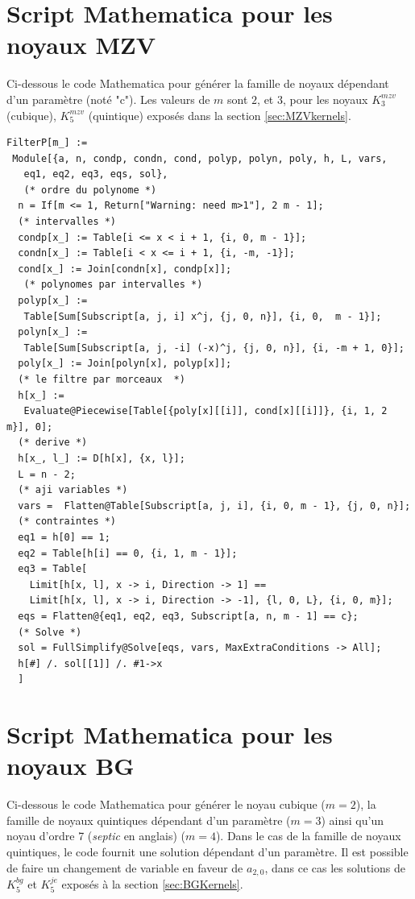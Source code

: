 \documentclass[11pt,twoside]{article}
\begin{document}
\section{Script Mathematica pour les noyaux MZV}
\label{sec:MathMZV}
Ci-dessous le code Mathematica pour générer la famille de noyaux dépendant d'un paramètre (noté "c"). Les valeurs de $m$ sont $2$, et $3$, pour les noyaux $K^{mzv}_3$ (cubique), $K^{mzv}_5$ (quintique) exposés dans la section \ref{sec:MZVkernels}.

\begin{lstlisting}[language=iPython]
FilterP[m_] := 
 Module[{a, n, condp, condn, cond, polyp, polyn, poly, h, L, vars, 
   eq1, eq2, eq3, eqs, sol},
   (* ordre du polynome *)
  n = If[m <= 1, Return["Warning: need m>1"], 2 m - 1];
  (* intervalles *)
  condp[x_] := Table[i <= x < i + 1, {i, 0, m - 1}];
  condn[x_] := Table[i < x <= i + 1, {i, -m, -1}];
  cond[x_] := Join[condn[x], condp[x]];
   (* polynomes par intervalles *)
  polyp[x_] := 
   Table[Sum[Subscript[a, j, i] x^j, {j, 0, n}], {i, 0,  m - 1}];
  polyn[x_] := 
   Table[Sum[Subscript[a, j, -i] (-x)^j, {j, 0, n}], {i, -m + 1, 0}];
  poly[x_] := Join[polyn[x], polyp[x]];
  (* le filtre par morceaux  *)
  h[x_] := 
   Evaluate@Piecewise[Table[{poly[x][[i]], cond[x][[i]]}, {i, 1, 2 m}], 0];
  (* derive *)
  h[x_, l_] := D[h[x], {x, l}];
  L = n - 2;
  (* aji variables *)
  vars =  Flatten@Table[Subscript[a, j, i], {i, 0, m - 1}, {j, 0, n}];
  (* contraintes *)
  eq1 = h[0] == 1;
  eq2 = Table[h[i] == 0, {i, 1, m - 1}];
  eq3 = Table[
    Limit[h[x, l], x -> i, Direction -> 1] == 
    Limit[h[x, l], x -> i, Direction -> -1], {l, 0, L}, {i, 0, m}];
  eqs = Flatten@{eq1, eq2, eq3, Subscript[a, n, m - 1] == c};
  (* Solve *)
  sol = FullSimplify@Solve[eqs, vars, MaxExtraConditions -> All];
  h[#] /. sol[[1]] /. #1->x
  ]
\end{lstlisting}
\section{Script Mathematica pour les noyaux BG}
\label{sec:MathBG}
Ci-dessous le code Mathematica pour générer le noyau cubique ($m=2$), la famille de noyaux quintiques  dépendant d'un paramètre ($m=3$) ainsi qu'un noyau d'ordre 7 (\textit{septic} en anglais) ($m=4$). Dans le cas de la famille de noyaux quintiques, le code fournit une solution dépendant d'un paramètre. Il est possible de faire un changement de variable en faveur de $a_{2,0}$, dans ce cas les solutions de $K_5^{bg}$ et $K_5^{je}$ exposés à la section \ref{sec:BGKernels}.
\end{document}

